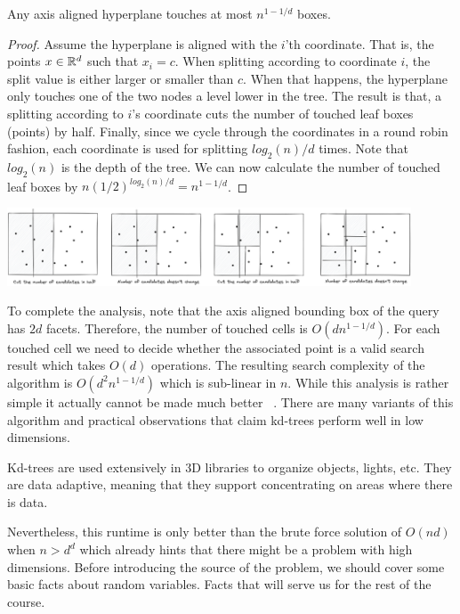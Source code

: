 \documentclass{article}
\begin{document}
\begin{fact}
Any axis aligned hyperplane touches at most $n^{1-1/d}$ boxes.
\end{fact}
\begin{proof}
Assume the hyperplane is aligned with the $i$'th coordinate. That is, the points $x\in{\mathbb{R}}^d$ such that $x_i = c$. 
When splitting according to coordinate $i$, the split value is either larger or smaller than $c$. 
When that happens, the hyperplane only touches one of the two nodes a level lower in the tree.
The result is that, a splitting according to $i$'s coordinate cuts the number of touched leaf boxes (points) by half.
Finally, since we cycle through the coordinates in a round robin fashion, each coordinate is used for splitting $log_2(n)/d$ times.
Note that $log_2(n)$ is the depth of the tree. We can now calculate the number of touched leaf boxes by $n (1/2)^{log_2(n)/d} = n^{1-1/d}$.
\end{proof}

\begin{center}
\includegraphics[width=0.9\textwidth]{images/kdtrees-proof.png}
\end{center}

To complete the analysis, note that the axis aligned bounding box of the query has $2d$ facets. Therefore, the number of touched cells is $O(dn^{1-1/d})$.
For each touched cell we need to decide whether the associated point is a valid search result which takes $O(d)$ operations. 
The resulting search complexity of the algorithm is $O(d^2n^{1-1/d})$ which is sub-linear in $n$.
While this analysis is rather simple it actually cannot be made much better  \cite{kdtree-worstcase}. There are many variants of this algorithm \cite{rptrees} and practical observations that claim kd-trees perform well in low dimensions. 

Kd-trees are used extensively in 3D libraries to organize objects, lights, etc. 
They are data adaptive, meaning that they support concentrating on areas where there is data. 



Nevertheless, this runtime is only better than the brute force solution of $O(nd)$ when $n > d^d$ which already hints that there might be a problem with high dimensions.
Before introducing the source of the problem, we should cover some basic facts about random variables. Facts that will serve us for the rest of the course.
\end{document}
